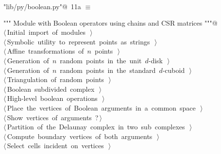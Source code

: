 \documentclass[11pt,oneside]{article}	%
\begin{document}
\begin{flushleft} \small
\begin{minipage}{\linewidth} \label{scrap16}
\protect{}\verb@"lib/py/boolean.py"@\nobreak\ {\footnotesize 11a }$\equiv$
\vspace{-1ex}
\begin{list}{}{} \item
\mbox{}\verb@""" Module with Boolean operators using chains and CSR matrices """@\\
\mbox{}\verb@@\hbox{$\langle\,$Initial import of modules\nobreak\ {\footnotesize {}}$\,\rangle$}\verb@@\\
\mbox{}\verb@@\hbox{$\langle\,$Symbolic utility to represent points as strings\nobreak\ {\footnotesize {}}$\,\rangle$}\verb@@\\
\mbox{}\verb@@\hbox{$\langle\,$Affine transformations of $n$ points\nobreak\ {\footnotesize {}}$\,\rangle$}\verb@@\\
\mbox{}\verb@@\hbox{$\langle\,$Generation of $n$ random points in the unit $d$-disk\nobreak\ {\footnotesize {}}$\,\rangle$}\verb@@\\
\mbox{}\verb@@\hbox{$\langle\,$Generation of $n$ random points in the standard $d$-cuboid\nobreak\ {\footnotesize {}}$\,\rangle$}\verb@@\\
\mbox{}\verb@@\hbox{$\langle\,$Triangulation of random points\nobreak\ {\footnotesize {}}$\,\rangle$}\verb@@\\
\mbox{}\verb@@\hbox{$\langle\,$Boolean subdivided complex\nobreak\ {\footnotesize {}}$\,\rangle$}\verb@@\\
\mbox{}\verb@@\hbox{$\langle\,$High-level boolean operations\nobreak\ {\footnotesize {}}$\,\rangle$}\verb@@\\
\mbox{}\verb@@\hbox{$\langle\,$Place the vertices of Boolean arguments in a common space\nobreak\ {\footnotesize {}}$\,\rangle$}\verb@@\\
\mbox{}\verb@@\hbox{$\langle\,$Show vertices of arguments\nobreak\ {\footnotesize ?}$\,\rangle$}\verb@@\\
\mbox{}\verb@@\hbox{$\langle\,$Partition of the Delaunay complex in two sub complexes\nobreak\ {\footnotesize {}}$\,\rangle$}\verb@@\\
\mbox{}\verb@@\hbox{$\langle\,$Compute boundary vertices of both arguments\nobreak\ {\footnotesize {}}$\,\rangle$}\verb@@\\
\mbox{}\verb@@\hbox{$\langle\,$Select cells incident on vertices\nobreak\ {\footnotesize {}}$\,\rangle$}\verb@@\\
\mbox{}\verb@@{\NWsep}
\end{list}
\vspace{-2ex}
\end{minipage}\\[4ex]
\end{flushleft}
\end{document}
